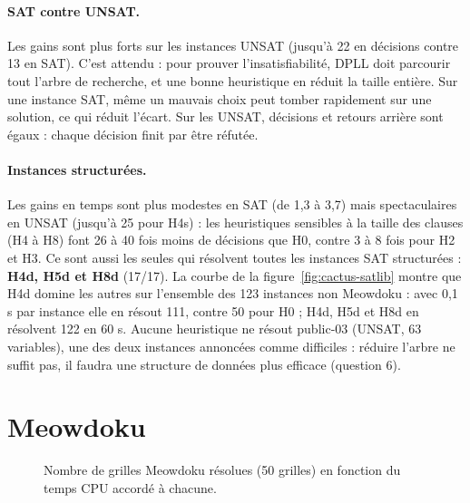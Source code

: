 \documentclass[11pt,a4paper]{article}
\newcommand{\cactus}[3]{\addplot[mark=none, thick, #3] table[x=cpu, y=solved]
  {generated/cactus-#1-#2.dat}; \addlegendentry{#2}}
\begin{document}
\paragraph{SAT contre UNSAT.} Les gains sont plus forts sur les instances
UNSAT (jusqu'à 22 en décisions contre 13 en SAT). C'est attendu : pour
prouver l'insatisfiabilité, DPLL doit parcourir tout l'arbre de recherche,
et une bonne heuristique en réduit la taille entière. Sur une instance SAT,
même un mauvais choix peut tomber rapidement sur une solution, ce qui
réduit l'écart. Sur les UNSAT, décisions et retours arrière sont égaux :
chaque décision finit par être réfutée.

\paragraph{Instances structurées.} Les gains en temps sont plus modestes en
SAT (de 1,3 à 3,7) mais spectaculaires en UNSAT (jusqu'à 25 pour H4s) : les
heuristiques sensibles à la taille des clauses (H4 à H8) font 26 à 40 fois
moins de décisions que H0, contre 3 à 8 fois pour H2 et H3. Ce sont aussi les seules qui
résolvent toutes les instances SAT structurées : \textbf{H4d, H5d et H8d}
(17/17). La courbe de la figure~\ref{fig:cactus-satlib} montre que H4d domine
les autres sur l'ensemble des 123 instances non Meowdoku : avec 0,1 s par
instance elle en résout 111, contre 50 pour H0 ; H4d, H5d et H8d en
résolvent 122 en 60 s.
Aucune heuristique ne résout public-03 (UNSAT, 63 variables), une des
deux instances annoncées comme difficiles : réduire l'arbre ne suffit pas,
il faudra une structure de données plus efficace (question 6).

\section{Meowdoku}

\begin{table}[htbp]\centering\small

\caption{Temps CPU médian (s) par taille de grille, Meowdoku de la
  question 1 (4 grilles par taille).}
\label{tab:taille}
\end{table}

\begin{figure}[htbp]\centering
{}
\caption{Nombre de grilles Meowdoku résolues (50 grilles) en fonction du
  temps CPU accordé à chacune.}
\label{fig:cactus-meowdoku}
\end{figure}
\end{document}

